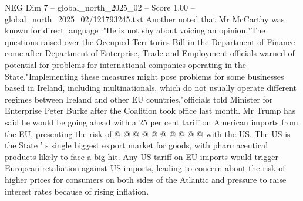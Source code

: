 \begin{textsample}{NEG Dim 7 – global\_north\_2025\_02 – Score 1.00 – global\_north\_2025\_02/121793245.txt}
Another noted that Mr McCarthy was known for direct language :"He is not shy about voicing an opinion."The questions raised over the Occupied Territories Bill in the Department of Finance come after Department of Enterprise, Trade and Employment officials warned of potential for problems for international companies operating in the State."Implementing these measures might pose problems for some businesses based in Ireland, including multinationals, which do not usually operate different regimes between Ireland and other EU countries,"officials told Minister for Enterprise Peter Burke after the Coalition took office last month.
Mr Trump has said he would be going ahead with a 25 per cent tariff on American imports from the EU, presenting the risk of @ @ @ @ @ @ @ @ @ @ with the US.
The US is the State ' s single biggest export market for goods, with pharmaceutical products likely to face a big hit.
Any US tariff on EU imports would trigger European retaliation against US imports, leading to concern about the risk of higher prices for consumers on both sides of the Atlantic and pressure to raise interest rates because of rising inflation.

\end{textsample}

